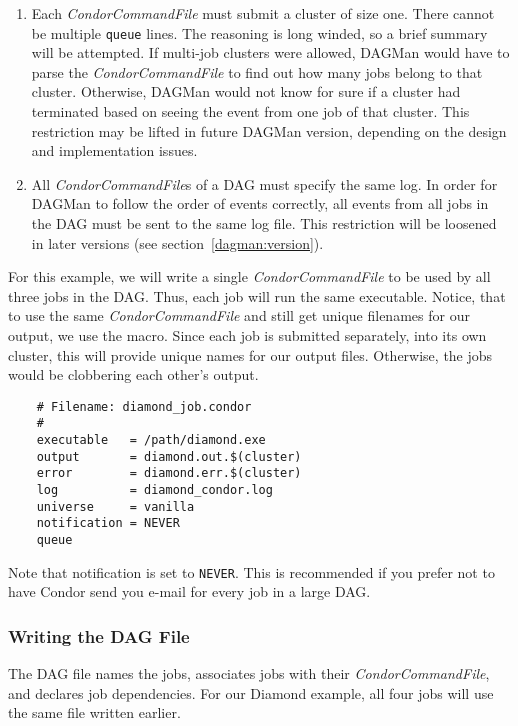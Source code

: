 \begin{enumerate}

\item Each \textit{CondorCommandFile} must submit a cluster of size one.
There cannot be multiple \texttt{queue} lines.  The reasoning is long winded,
so a brief summary will be attempted.  If multi-job clusters were allowed,
DAGMan would have to parse the \textit{CondorCommandFile} to find out how many
jobs belong to that cluster.  Otherwise, DAGMan would not know for sure if a
cluster had terminated based on seeing the event from one job of that
cluster.  This restriction may be lifted in future DAGMan version, depending
on the design and implementation issues.

\item All \textit{CondorCommandFile}s of a DAG must specify the same log.
In order for DAGMan to follow the order of events correctly, all events from
all jobs in the DAG must be sent to the same log file.  This restriction will
be loosened in later versions (see section~\ref{dagman:version}).

\end{enumerate}

For this example, we will write a single \textit{CondorCommandFile} to be used
by all three jobs in the DAG.  Thus, each job will run the same executable.
Notice, that to use the same \textit{CondorCommandFile} and still get
unique filenames for our output, we use the  macro.
Since each job is submitted separately, into its own cluster, this
will provide unique names for our output files.
Otherwise, the jobs would be clobbering each other's output.  

\begin{verbatim}
	# Filename: diamond_job.condor
	#
	executable   = /path/diamond.exe
	output       = diamond.out.$(cluster)
	error        = diamond.err.$(cluster)
	log          = diamond_condor.log
	universe     = vanilla
	notification = NEVER
	queue
\end{verbatim}

Note that notification is set to \texttt{NEVER}.  This is recommended if you
prefer not to have Condor send you e-mail for every job in a large DAG.

\subsubsection{\label{dagman:writedag}Writing the DAG File}

The DAG file names the jobs, associates jobs with their
\textit{CondorCommandFile}, and declares job dependencies.  For our Diamond
example, all four jobs will use the same  file
written earlier.

